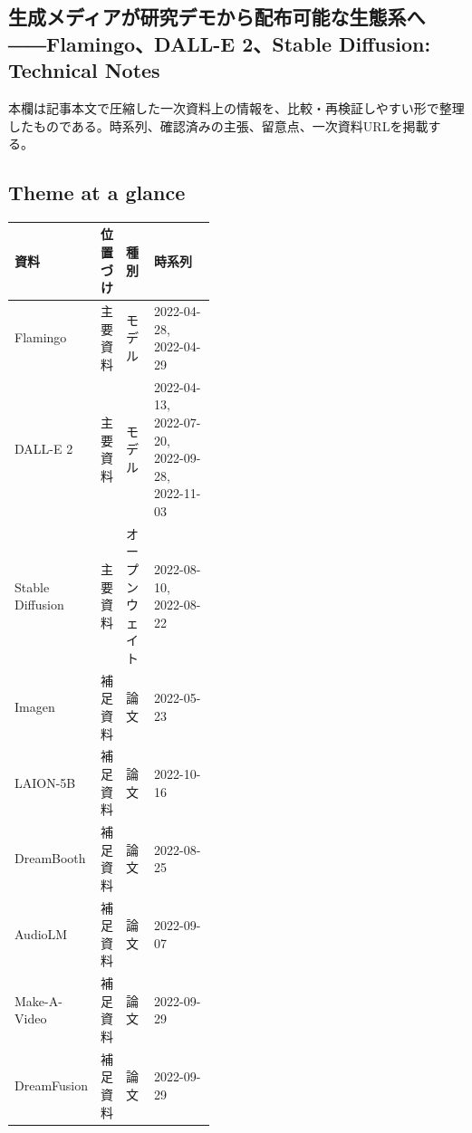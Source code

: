 \subsection*{生成メディアが研究デモから配布可能な生態系へ――Flamingo、DALL-E 2、Stable Diffusion: Technical Notes}
本欄は記事本文で圧縮した一次資料上の情報を、比較・再検証しやすい形で整理したものである。時系列、確認済みの主張、留意点、一次資料URLを掲載する。
\smallskip
{}\par
\medskip
\subsection*{Theme at a glance}
\begin{center}
\footnotesize
\begin{tabularx}{\linewidth}{@{}p{0.20\linewidth}p{0.10\linewidth}p{0.14\linewidth}X@{}}
\toprule
資料 & 位置づけ & 種別 & 時系列 \\
\midrule
Flamingo & 主要資料 & モデル & 2022-04-28, 2022-04-29 \\
DALL-E 2 & 主要資料 & モデル & 2022-04-13, 2022-07-20, 2022-09-28, 2022-11-03 \\
Stable Diffusion & 主要資料 & オープンウェイト & 2022-08-10, 2022-08-22 \\
Imagen & 補足資料 & 論文 & 2022-05-23 \\
LAION-5B & 補足資料 & 論文 & 2022-10-16 \\
DreamBooth & 補足資料 & 論文 & 2022-08-25 \\
AudioLM & 補足資料 & 論文 & 2022-09-07 \\
Make-A-Video & 補足資料 & 論文 & 2022-09-29 \\
DreamFusion & 補足資料 & 論文 & 2022-09-29 \\
\bottomrule
\end{tabularx}
\end{center}
\normalsize

